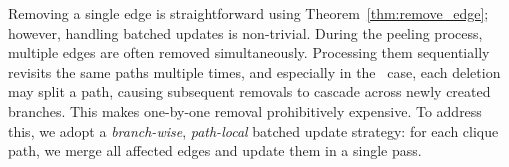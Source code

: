 % 



%
Removing a single edge is straightforward using Theorem~\ref{thm:remove_edge}; 
however, handling batched updates is non-trivial.
%
During the peeling process, multiple edges are often removed simultaneously. 
Processing them sequentially revisits the same paths multiple times, and especially in the \pivot{-}\pivot\ case, each deletion may split a path, causing subsequent removals to cascade across newly created branches. 
%
This makes one-by-one removal prohibitively expensive. 
%
To address this, we adopt a \textit{branch-wise}, \textit{path-local} batched update strategy: for each clique path, we merge all affected edges and update them in a single pass.



